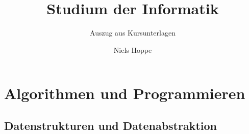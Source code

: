 

\title{Studium der Informatik}
\subtitle{Auszug aus Kursunterlagen}
\author{Niels Hoppe}



\maketitle
\tableofcontents

\part{Algorithmen und Programmieren}
\chapter{Datenstrukturen und Datenabstraktion}



